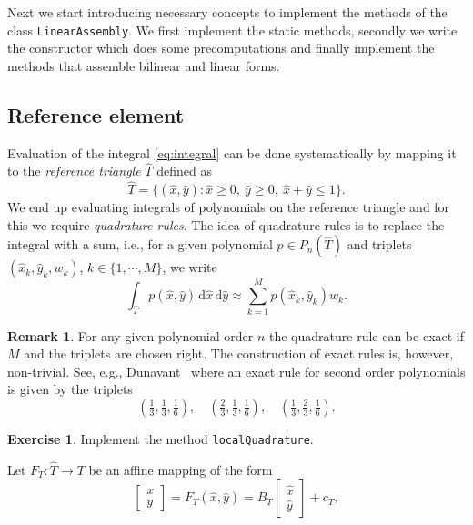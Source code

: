 \documentclass{amsart}
\theoremstyle{definition}
\newtheorem{remark}{Remark}
\newtheorem{exercise}{\color{red}Exercise}
\begin{document}
Next we start introducing necessary concepts to implement the methods
of the class \verb|LinearAssembly|. We first implement the static
methods, secondly we write the constructor which does some
precomputations and finally implement the methods that assemble
bilinear and linear forms.

\subsection{Reference element}

Evaluation of the integral \eqref{eq:integral} can be done
systematically by mapping it to the \emph{reference triangle}
$\widehat{T}$ defined as
\begin{equation}
  \widehat{T} = \{ (\widehat{x}, \widehat{y}) : \widehat{x} \geq 0,~ \widehat{y} \geq 0,~ \widehat{x}+\widehat{y}\leq 1 \}.
\end{equation}
We end up evaluating integrals of polynomials on the reference
triangle and for this we require \emph{quadrature rules}. The idea of
quadrature rules is to replace the integral with a sum, i.e., for
a given polynomial $p \in P_n(\widehat{T})$
and triplets $(\widehat{x}_k,\widehat{y}_k,w_k)$, $k \in \{1, \cdots, M\}$,
we write
\begin{equation}
  \int_{\widehat{T}} p(\widehat{x},\widehat{y}) \,\mathrm{d}\widehat{x}\,\mathrm{d}\widehat{y} \approx \sum_{k = 1}^{M} p(\widehat{x}_k,\widehat{y}_k) w_k.
\end{equation}
\begin{remark}
  For any given polynomial order $n$ the quadrature rule can be exact
  if $M$ and the triplets are chosen right. The construction of exact
  rules is, however, non-trivial. See, e.g., Dunavant~\cite{D85} where
  an exact rule for second order polynomials is given by the triplets
  \begin{equation}
    (\tfrac{1}{3},\tfrac{1}{3},\tfrac{1}{6}), \quad 
    (\tfrac{2}{3},\tfrac{1}{3},\tfrac{1}{6}), \quad 
    (\tfrac{1}{3},\tfrac{2}{3},\tfrac{1}{6}).
  \end{equation}
\end{remark}
\begin{exercise}
  Implement the method \verb|localQuadrature|.
\end{exercise}
Let $F_T : \widehat{T} \rightarrow T$ be an affine mapping of the form
\begin{equation}
  \begin{bmatrix} x \\ y \end{bmatrix} = F_T(\widehat{x},\widehat{y}) = B_T\begin{bmatrix} \widehat{x} \\ \widehat{y}\end{bmatrix}+c_T, 
\end{equation}
\end{document}
